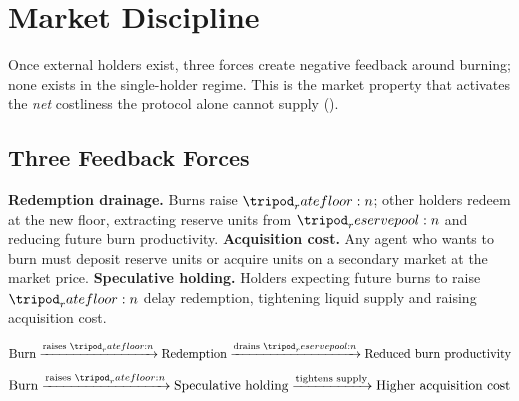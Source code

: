 \documentclass[../main.tex]{subfiles}
\begin{document}
%
%
%

\section{Market Discipline}
\label{sec:attestation:discipline}

Once external holders exist, three forces create negative feedback around burning; none
exists in the single-holder regime. This is the market property that activates the
\emph{net} costliness the protocol alone cannot supply
().

\subsection{Three Feedback Forces}
\label{sec:discipline:forces}

\textbf{Redemption drainage.} Burns raise $\ratefloor{}$; other holders redeem at the new
floor, extracting reserve units from $\reservepool{}$ and reducing future burn
productivity. \textbf{Acquisition cost.} Any agent who wants to burn must deposit reserve
units or acquire \liveclass{} units on a secondary market at the market price.
\textbf{Speculative holding.} Holders expecting future burns to raise $\ratefloor{}$ delay
redemption, tightening liquid supply and raising acquisition cost.

\begin{equation*}
    \text{Burn}
    \xrightarrow{\text{raises } \ratefloor{}}
    \text{Redemption}
    \xrightarrow{\text{drains } \reservepool{}}
    \text{Reduced burn productivity}
\end{equation*}
\begin{equation*}
    \text{Burn}
    \xrightarrow{\text{raises } \ratefloor{}}
    \text{Speculative holding}
    \xrightarrow{\text{tightens supply}}
    \text{Higher acquisition cost}
\end{equation*}
\end{document}

